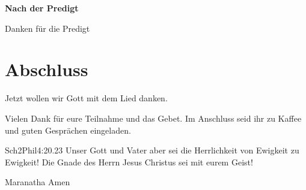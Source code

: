 \documentclass{../inc/mybib}
\begin{document}
\textbf{Nach der Predigt}

Danken für die Predigt

\section{Abschluss}

Jetzt wollen wir Gott mit dem Lied  danken.


Vielen Dank für eure Teilnahme und das Gebet. Im Anschluss seid ihr zu Kaffee und guten Gesprächen eingeladen.
\beten{}

\begin{bibeltext}{Sch2}{Phil}{4:20.23}
Unser Gott und Vater aber sei die Herrlichkeit von Ewigkeit zu Ewigkeit!
Die Gnade des Herrn Jesus Christus sei mit eurem Geist!
\end{bibeltext}

Maranatha Amen
\end{document}
